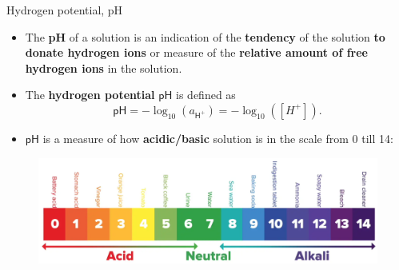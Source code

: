 \begin{frame}{Hydrogen potential, pH}

\begin{itemize}
	\item The \alert{\textbf{pH}} of a solution is an indication of the \textbf{tendency} of the solution \textbf{to donate hydrogen ions}
	or measure of the \textbf{relative amount of free hydrogen ions} in the solution. 
		\pause
	
\item The \alert{\textbf{hydrogen potential}} $\mathsf{pH}$ is defined as
%
\[
\boxed{ 
\mathsf{pH} = - \log_{10} (a_{\mathsf{H^+}}) = - \log_{10} ([H^+]). 
}
\]
%
\vskip -10pt
	\pause
\item $\mathsf{pH}$ is a measure of how \textbf{acidic/basic} solution is in the scale from 0 till 14: 
%
%
\end{itemize}
\begin{figure}
\centering
\includegraphics[width=0.9\columnwidth]{figures/chemical-equilibrium/ph-scale.png}
\end{figure}
\end{frame}

